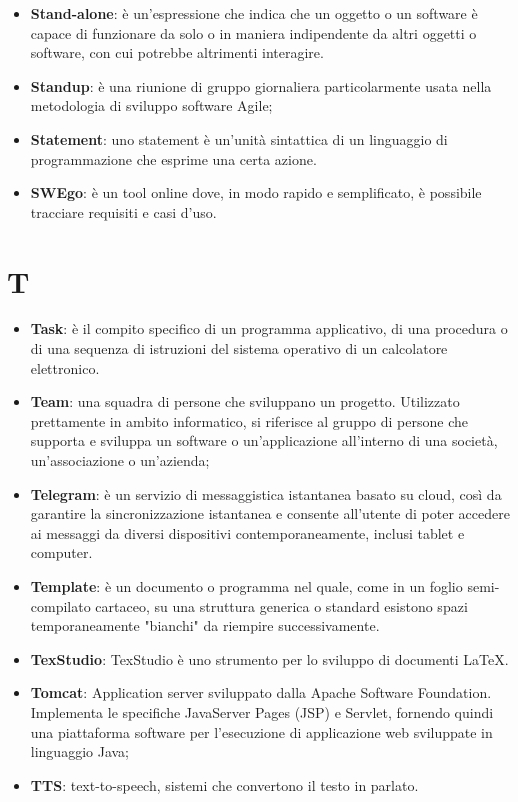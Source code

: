 \documentclass[a4paper, oneside, openany]{article}
\begin{document}
\begin{itemize}
\item \textbf{Stand-alone}: è un'espressione che indica che un oggetto o un software è capace di funzionare da solo o in maniera indipendente da altri oggetti o software, con cui potrebbe altrimenti interagire.
\item \textbf{Standup}: è una riunione di gruppo giornaliera particolarmente usata nella metodologia di sviluppo software Agile;
\item \textbf{Statement}: uno statement è un'unità sintattica di un linguaggio di programmazione che esprime una certa azione.
\item \textbf{SWEgo}: è un tool online dove, in modo rapido e semplificato, è possibile tracciare requisiti e casi d'uso.
\end{itemize}

\section{T}
\begin{itemize}
\item \textbf{Task}: è il compito specifico di un programma applicativo, di una procedura o di una sequenza di istruzioni del sistema operativo di un calcolatore elettronico.
\item \textbf{Team}: una squadra di persone che sviluppano un progetto. Utilizzato prettamente in ambito informatico, si riferisce al gruppo di persone che supporta e sviluppa
un software o un’applicazione all’interno di una società, un’associazione o un’azienda;
\item \textbf{Telegram}: è un servizio di messaggistica istantanea basato su cloud, così da garantire la sincronizzazione istantanea e consente all'utente di poter accedere ai messaggi da diversi dispositivi contemporaneamente, inclusi tablet e computer.
\item \textbf{Template}: è un documento o programma nel quale, come in un foglio semi-compilato cartaceo, su una struttura generica o standard esistono spazi temporaneamente "bianchi" da riempire successivamente.
\item \textbf{TexStudio}: TexStudio è uno strumento per lo sviluppo di documenti LaTeX.
\item \textbf{Tomcat}: Application server sviluppato dalla Apache Software Foundation. Implementa le specifiche JavaServer Pages (JSP) e Servlet, fornendo quindi una piattaforma software per l’esecuzione di applicazione web sviluppate in linguaggio Java;
\item \textbf{TTS}: text-to-speech, sistemi che convertono il testo in parlato.
\end{itemize}
\end{document}
